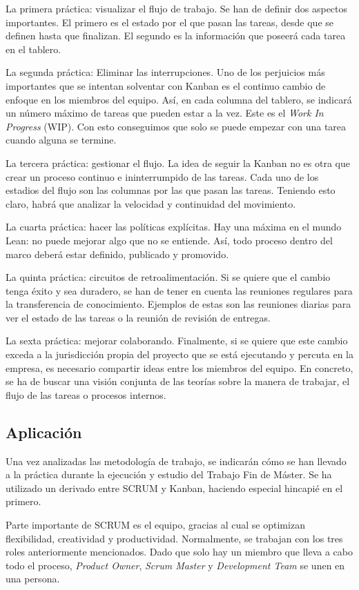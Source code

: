 La primera práctica: visualizar el flujo de trabajo. Se han de definir dos aspectos importantes. El primero es el estado por el que pasan las tareas, desde que se definen hasta que finalizan. El segundo es la información que poseerá cada tarea en el tablero.

La segunda práctica: Eliminar las interrupciones. Uno de los perjuicios más importantes que se intentan solventar con Kanban es el continuo cambio de enfoque en los miembros del equipo. Así, en cada columna del tablero, se indicará un número máximo de tareas que pueden estar a la vez. Este es el \textit{Work In Progress} (WIP). Con esto conseguimos que solo se puede empezar con una tarea cuando alguna se termine.

La tercera práctica: gestionar el flujo. La idea de seguir la Kanban no es otra que crear un proceso continuo e ininterrumpido de las tareas. Cada uno de los estadios del flujo son las columnas por las que pasan las tareas. Teniendo esto claro, habrá que analizar la velocidad y continuidad del movimiento.

La cuarta práctica: hacer las políticas explícitas. Hay una máxima en el mundo Lean: no puede mejorar algo que no se entiende. Así, todo proceso dentro del marco deberá estar definido, publicado y promovido.

La quinta práctica: circuitos de retroalimentación. Si se quiere que el cambio tenga éxito y sea duradero, se han de tener en cuenta las reuniones regulares para la transferencia de conocimiento. Ejemplos de estas son las reuniones diarias para ver el estado de las tareas o la reunión de revisión de entregas.

La sexta práctica: mejorar colaborando. Finalmente, si se quiere que este cambio exceda a la jurisdicción propia del proyecto que se está ejecutando y percuta en la empresa, es necesario compartir ideas entre los miembros del equipo. En concreto, se ha de buscar una visión conjunta de las teorías sobre la manera de trabajar, el flujo de las tareas o procesos internos.

\subsection{Aplicación}
Una vez analizadas las metodología de trabajo, se indicarán cómo se han llevado a la práctica durante la ejecución y estudio del Trabajo Fin de Máster. Se ha utilizado un derivado entre SCRUM y Kanban, haciendo especial hincapié en el primero.

Parte importante de SCRUM es el equipo, gracias al cual se optimizan flexibilidad, creatividad y productividad. Normalmente, se trabajan con los tres roles anteriormente mencionados. Dado que solo hay un miembro que lleva a cabo todo el proceso, \textit{Product Owner}, \textit{Scrum Master} y \textit{Development Team} se unen en una persona.

